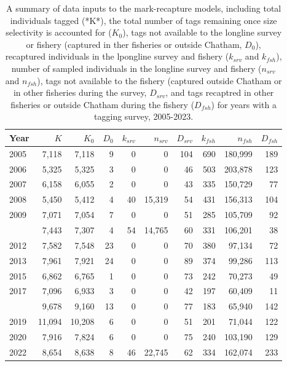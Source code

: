 \documentclass[
]{article}
\begin{document}
\begin{longtable}[t]{lrrrrrrrrr}
\caption{\label{tab:mr}A summary of data inputs to the mark-recapture models, including total individuals tagged (*K*), the total number of tags remaining once size selectivity is accounted for ($K_0$), tags not available to the longline survey or fishery (captured in ther fisheries or outside Chatham, $D_0$), recaptured individuals in the lpongline survey and fishery ($k_{srv}$ and $k_{fsh}$), number of sampled individuals in the longline survey and fishery ($n_{srv}$ and $n_{fsh}$), tags not available to the fishery (captured outside Chatham or in other fisheries during the survey, $D_{srv}$, and tags recaptred in other fisheries or outside Chatham during the fishery ($D_{fsh}$) for years with a tagging survey, 2005-2023.}\\
\toprule
Year & $K$ & $K_0$ & $D_0$ & $k_{srv}$ & $n_{srv}$ & $D_{srv}$ & $k_{fsh}$ & $n_{fsh}$ & $D_{fsh}$\\
\midrule
2005 & 7,118 & 7,118 & 9 & 0 & 0 & 104 & 690 & 180,999 & 189\\
2006 & 5,325 & 5,325 & 3 & 0 & 0 & 46 & 503 & 203,878 & 123\\
2007 & 6,158 & 6,055 & 2 & 0 & 0 & 43 & 335 & 150,729 & 77\\
2008 & 5,450 & 5,412 & 4 & 40 & 15,319 & 54 & 431 & 156,313 & 104\\
2009 & 7,071 & 7,054 & 7 & 0 & 0 & 51 & 285 & 105,709 & 92\\
\addlinespace
2010 & 7,443 & 7,307 & 4 & 54 & 14,765 & 60 & 331 & 106,201 & 38\\
2012 & 7,582 & 7,548 & 23 & 0 & 0 & 70 & 380 & 97,134 & 72\\
2013 & 7,961 & 7,921 & 24 & 0 & 0 & 89 & 374 & 99,286 & 113\\
2015 & 6,862 & 6,765 & 1 & 0 & 0 & 73 & 242 & 70,273 & 49\\
2017 & 7,096 & 6,933 & 3 & 0 & 0 & 42 & 197 & 60,409 & 11\\
\addlinespace
2018 & 9,678 & 9,160 & 13 & 0 & 0 & 77 & 183 & 65,940 & 142\\
2019 & 11,094 & 10,208 & 6 & 0 & 0 & 51 & 201 & 71,044 & 122\\
2020 & 7,916 & 7,824 & 6 & 0 & 0 & 75 & 240 & 103,190 & 129\\
2022 & 8,654 & 8,638 & 8 & 46 & 22,745 & 62 & 334 & 162,074 & 233\\
\bottomrule
\end{longtable}

\newpage
\end{document}
